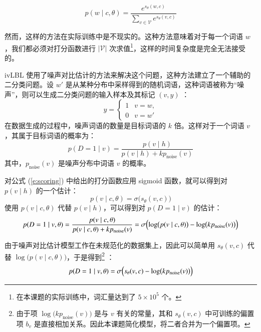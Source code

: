 \begin{equation}
p(w \mid c, \theta) = \frac{e^{s_\theta(w, c)}}{\sum_{v \in \mathcal{V}}e^{s_\theta(v, c)}}
\label{e:softmax}
\end{equation}

然而，这样的方法在实际训练中是不现实的。这种方法意味着对于每一个词语 $w$，我们都必须对打分函数进行 $|\mathcal{V}|$ 次求值\footnote{在本课题的实际训练中，词汇量达到了 $5 \times 10^5$ 个。}，这样的时间复杂度是完全无法接受的。

ivLBL 使用了噪声对比估计的方法来解决这个问题，这种方法建立了一个辅助的二分类问题。设 $w'$ 是从某种分布中采样得到的随机词语，这种词语被称为“噪声”，则可以生成二分类问题的输入样本及其标记 $(v, y)$ ：
\begin{equation}
y = \begin{cases}
1 & v = w, \\
0 & v = w'
\end{cases}
\end{equation}
在数据生成的过程中，噪声词语的数量是目标词语的 $k$ 倍。这样对于一个词语 $v$，其属于目标词语的概率为：
\begin{equation}
p(D = 1 \mid v) = \frac{p(v \mid h)}{p(v \mid h) + k p_\text{noise}(v)}
\end{equation}
其中，$p_\text{noise}(v)$ 是噪声分布中词语 $v$ 的概率。

对公式 (\ref{e:scoring}) 中给出的打分函数应用 sigmoid 函数，就可以得到对 $p(v \mid h)$ 的一个估计：
\begin{equation}
p(v \mid c, \theta) = \sigma\bigl(s_\theta(v, c)\bigr)
\end{equation}
使用 $p(v \mid c, \theta)$ 代替 $p(v \mid h)$，可以得到对 $p(D = 1 \mid v)$ 的估计：
\begin{equation}
p(D = 1 \mid v, \theta) = \frac{p(v \mid c, \theta)}{p(v \mid c, \theta) + k p_\text{noise}(v)} = \sigma\Bigl(\log\bigl(p(v \mid c, \theta)\bigr) - \log\bigl(k p_\text{noise}(v)\bigr)\Bigr)
\end{equation}

由于噪声对比估计模型工作在未规范化的数据集上，因此可以简单用 $s_\theta(v, c)$ 代替 $\log\bigl(p(v \mid c, \theta)\bigr)$，于是得到\footnote{由于项 $\log\bigl(k p_\text{noise}(v)\bigr)$ 是与 $v$ 有关的常量，其和 $s_\theta(v, c)$ 中可训练的偏置项 $b_v$ 是直接相加关系。因此本课题简化模型，将二者合并为一个偏置项。} ：
\begin{equation}
p(D = 1 \mid v, \theta) = \sigma\Bigl(s_\theta(v, c) - \log\bigl(k p_\text{noise}(v)\bigr)\Bigr)
\end{equation}

